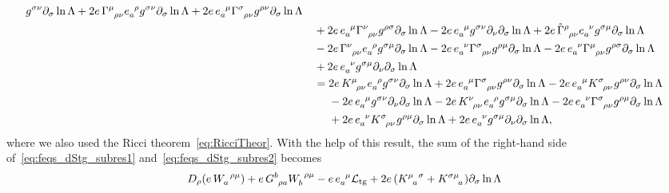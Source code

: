 \documentclass[
final,
11pt,
a4paper,
DIV=11,
headinclude=true,
footinclude=false,
bibliography=totoc,
twoside=true,  %
BCOR=5mm
]{scrbook}
\begin{document}
\begin{subappendices}
\begin{align*}
  g^{\sigma\nu} \pd_\sigma \ln\Lambda + 2e\, 
  \Gamma\ind{^\mu_{\rho\nu}} e\ind{_a^\rho} g^{\sigma\nu} 
  \pd_\sigma \ln\Lambda + 2e\, e\ind{_a^\mu} 
  \Gamma\ind{^\sigma_{\rho\nu}} g^{\rho\nu} \pd_\sigma \ln\Lambda 
  \\
  &\hspace{1em}
  + 2e\, e\ind{_a^\mu} \Gamma\ind{^\nu_{\rho\nu}} g^{\rho\sigma} 
  \pd_\sigma \ln\Lambda - 2e\, e\ind{_a^\mu} g^{\sigma\nu} 
  \pd_\nu \pd_\sigma \ln\Lambda + 2e\, 
  \mring{\Gamma}\ind{^\rho_{\rho\nu}} e\ind{_a^\nu} g^{\sigma\mu} 
  \pd_\sigma \ln\Lambda
  \\
  &\hspace{1em}
  - 2e\, \Gamma\ind{^\nu_{\rho\nu}} e\ind{_a^\rho} g^{\sigma\mu} 
  \pd_\sigma \ln\Lambda - 2e\, e\ind{_a^\nu} 
  \Gamma\ind{^\sigma_{\rho\nu}} g^{\rho\mu} \pd_\sigma \ln\Lambda 
  - 2e\, e\ind{_a^\nu} \Gamma\ind{^\mu_{\rho\nu}} g^{\rho\sigma} 
  \pd_\sigma \ln\Lambda
  \\
  &\hspace{1em}
  + 2e\, e\ind{_a^\nu} g^{\sigma\mu} \pd_\nu \pd_\sigma 
  \ln\Lambda
  \\
  &\hspace{1em}
  = 2e\, K\ind{^\mu_{\rho\nu}} e\ind{_a^\rho} g^{\sigma\nu} 
  \pd_\sigma \ln\Lambda + 2e\, e\ind{_a^\mu} 
  \Gamma\ind{^\sigma_{\rho\nu}} g^{\rho\nu} \pd_\sigma \ln\Lambda 
  - 2e\, e\ind{_a^\mu} K\ind{^\sigma_{\rho\nu}} g^{\rho\nu} 
  \pd_\sigma \ln\Lambda
  \\
  &\hspace{1em}
  \nla{}- 2e\, e\ind{_a^\mu} g^{\sigma\nu} \pd_\nu \pd_\sigma 
  \ln\Lambda - 2 e\, K\ind{^\nu_{\rho\nu}} e\ind{_a^\rho} 
  g^{\sigma\mu} \pd_\sigma \ln\Lambda - 2e\, e\ind{_a^\nu} 
  \Gamma\ind{^\sigma_{\rho\nu}} g^{\rho\mu} \pd_\sigma \ln\Lambda 
  \\
  &\hspace{1em}
  \nla{}+ 2e\, e\ind{_a^\nu} K\ind{^\sigma_{\rho\nu}} g^{\rho\mu} 
  \pd_\sigma \ln\Lambda + 2e\, e\ind{_a^\nu} g^{\sigma\mu} 
  \pd_\nu \pd_\sigma \ln\Lambda,
\end{align*}
where we also used the Ricci theorem~\eqref{eq:RicciTheor}.  With 
the help of this result, the sum of the right-hand side 
of~\eqref{eq:feqs_dStg_subres1} and~\eqref{eq:feqs_dStg_subres2} 
becomes
\begin{align*}
  &D_\rho (e\, W\ind{_a^{\rho\mu}}) + e\, G\ind{^b_{\rho a}} 
  W\ind{_b^{\rho\mu}} - e\, e\ind{_a^\mu} \mathcal{L}_\mrm{tg} 
  +2e\, (K\ind{^\mu_a^\sigma} + K\ind{^{\sigma\mu}_a}) \pd_\sigma 
  \ln\Lambda

\end{align*}
\end{subappendices}
\end{document}

